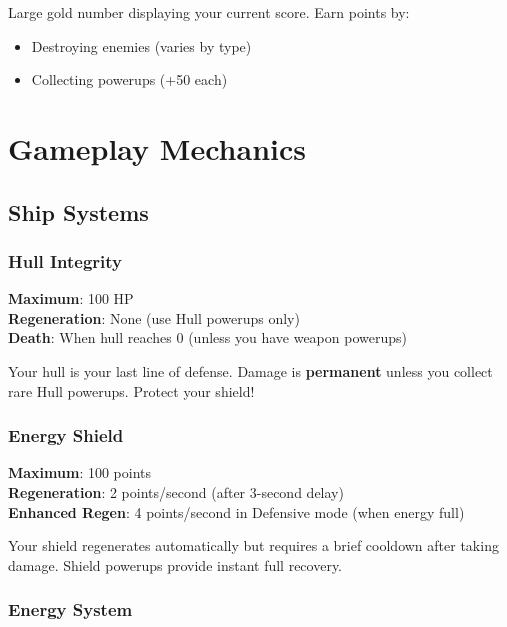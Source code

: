 \documentclass[11pt,a4paper]{article}
\begin{document}
Large gold number displaying your current score. Earn points by:
\begin{itemize}[nosep]
    \item Destroying enemies (varies by type)
    \item Collecting powerups (+50 each)
\end{itemize}

\section{Gameplay Mechanics}

\subsection{Ship Systems}

\subsubsection{Hull Integrity}

\begin{tcolorbox}[mybox]
\textbf{Maximum}: 100 HP\\
\textbf{Regeneration}: None (use Hull powerups only)\\
\textbf{Death}: When hull reaches 0 (unless you have weapon powerups)
\end{tcolorbox}

Your hull is your last line of defense. Damage is \textbf{permanent} unless you collect rare Hull powerups. Protect your shield!

\subsubsection{Energy Shield}

\begin{tcolorbox}[mybox]
\textbf{Maximum}: 100 points\\
\textbf{Regeneration}: 2 points/second (after 3-second delay)\\
\textbf{Enhanced Regen}: 4 points/second in Defensive mode (when energy full)
\end{tcolorbox}

Your shield regenerates automatically but requires a brief cooldown after taking damage. Shield powerups provide instant full recovery.

\subsubsection{Energy System}
\end{document}
